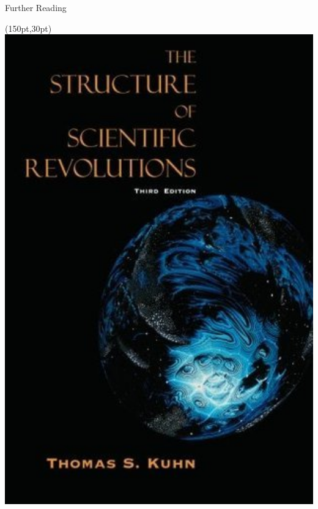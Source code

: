 \documentclass{beamer}
\begin{document}
\begin{frame}{Further Reading}
	\begin{textblock*}{60pt}(150pt,30pt)
		\includegraphics[width=1\textwidth]{../images/structures.jpg}
	\end{textblock*}


\end{frame}
\end{document}
